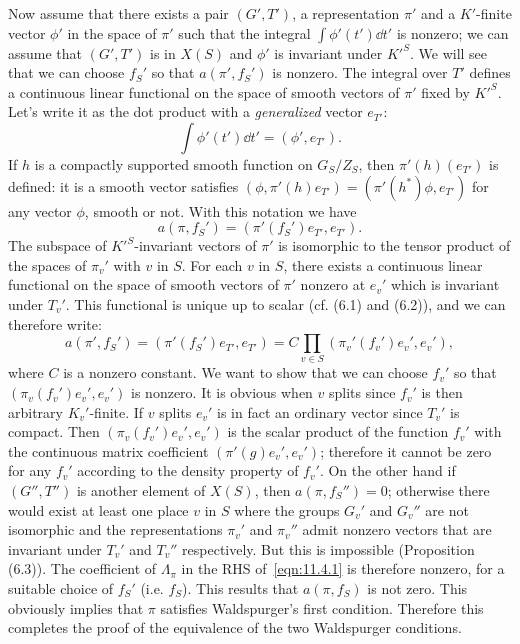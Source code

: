 Now assume that there exists a pair $(G', T')$, a representation $\pi'$ and a $K'$-finite vector $\phi'$ in the space of $\pi'$ such that the integral $\int \phi'(t')\dd t'$ is nonzero; we can assume that $(G', T')$ is in $X(S)$ and $\phi'$ is invariant under $K'^S$.
We will see that we can choose $f_S'$ so that $a(\pi', f_S')$ is nonzero.
The integral over $T'$ defines a continuous linear functional on the space of smooth vectors of $\pi'$ fixed by $K'^S$.
Let's write it as the dot product with a \emph{generalized} vector $e_{T'}$:
\begin{equation*}
    \int \phi'(t') \dd t' = (\phi', e_{T'}).
\end{equation*}
If $h$ is a compactly supported smooth function on $G_S / Z_S$, then $\pi'(h)(e_{T'})$ is defined: it is a smooth vector satisfies $(\phi, \pi'(h)e_{T'}) = (\pi'(h^*)\phi, e_{T'})$ for any vector $\phi$, smooth or not.
With this notation we have
\begin{equation*}
    a(\pi, f_S') = (\pi'(f_S')e_{T'}, e_{T'}).
\end{equation*}
The subspace of $K'^S$-invariant vectors of $\pi'$ is isomorphic to the tensor product of the spaces of $\pi_v'$ with $v$ in $S$.
For each $v$ in $S$, there exists a continuous linear functional on the space of smooth vectors of $\pi'$ nonzero at $e_v'$ which is invariant under $T_v'$.
This functional is unique up to scalar (cf. (6.1) and (6.2)), and we can therefore write:
\begin{equation*}
    a(\pi', f_S') = (\pi'(f_S')e_{T'}, e_{T'}) = C \prod_{v\in S} (\pi_v'(f_v')e_v', e_v'),
\end{equation*}
where $C$ is a nonzero constant.
We want to show that we can choose $f_v'$ so that $(\pi_v(f_v')e_v', e_v')$ is nonzero.
It is obvious when $v$ splits since $f_v'$ is then arbitrary $K_v'$-finite.
If $v$ splits $e_v'$ is in fact an ordinary vector since $T_v'$ is compact.
Then $(\pi_v(f_v')e_v', e_v')$ is the scalar product of the function $f_v'$ with the continuous matrix coefficient $(\pi'(g)e_v', e_v')$; therefore it cannot be zero for any $f_v'$ according to the density property of $f_v'$.
On the other hand if $(G'', T'')$ is another element of $X(S)$, then $a(\pi, f_S'')=0$; otherwise there would exist at least one place $v$ in $S$ where the groups $G_v'$ and $G_v''$ are not isomorphic and the representations $\pi_v'$ and $\pi_v''$ admit nonzero vectors that are invariant under $T_v'$ and $T_v''$ respectively.
But this is impossible (Proposition (6.3)).
The coefficient of $\Lambda_\pi$ in the RHS of~\eqref{eqn:11.4.1} is therefore nonzero, for a suitable choice of $f_S'$ (i.e. $f_S$).
This results that $a(\pi, f_S)$ is not zero.
This obviously implies that $\pi$ satisfies Waldspurger's first condition.
Therefore this completes the proof of the equivalence of the two Waldspurger conditions.